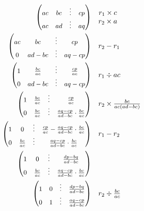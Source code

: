 \documentclass[../main]{subfiles}
\begin{document}
\begin{align*}
    \PMat{ac&bc&\vdots&cp\\ac&ad&\vdots&aq} &
    \quad \begin{matrix}
        r_1\times c\\r_2\times a
    \end{matrix} \\
    \PMat{ac&bc&\vdots&cp\\0&ad-bc&\vdots&aq-cp} &
    \quad \begin{matrix}
        r_2-r_1
    \end{matrix} \\
    \PMat{1&\frac{bc}{ac}&\vdots&\frac{cp}{ac}\\0&ad-bc&\vdots&aq-cp} &
    \quad \begin{matrix}
        r_1\div ac
    \end{matrix} \\
    \PMat{1&\frac{bc}{ac}&\vdots&\frac{cp}{ac}\\0&\frac{bc}{ac}&\vdots&\frac{aq-cp}{ad-bc}\cdot\frac{bc}{ac}} &
    \quad \begin{matrix}
        r_2\times \frac{bc}{ac(ad-bc)}
    \end{matrix} \\
    \PMat{1&0&\vdots&\frac{cp}{ac}-\frac{aq-cp}{ad-bc}\cdot\frac{bc}{ac}\\0&\frac{bc}{ac}&\vdots&\frac{aq-cp}{ad-bc}\cdot\frac{bc}{ac}} &
    \quad \begin{matrix}
        r_1-r_2
    \end{matrix} \\
    \PMat{1&0&\vdots&\frac{dp-bq}{ad-bc}\\0&\frac{bc}{ac}&\vdots&\frac{aq-cp}{ad-bc}\cdot\frac{bc}{ac}} &
    \quad \begin{matrix}
    \end{matrix} \\
    \PMat{1&0&\vdots&\frac{dp-bq}{ad-bc}\\0&1&\vdots&\frac{aq-cp}{ad-bc}} &
    \quad \begin{matrix}
        r_2\div \frac{bc}{ac}
    \end{matrix}
\end{align*}
\end{document}
